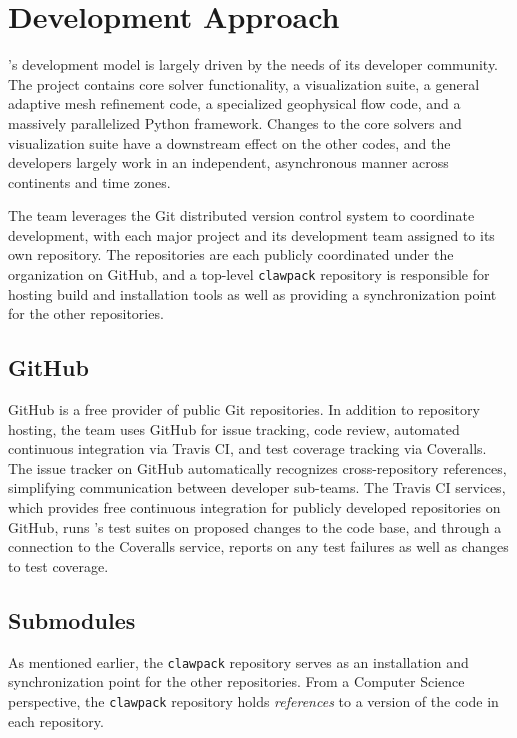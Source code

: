 %
%
%

\section{Development Approach}

\clawpack's development model is largely driven by the needs of its
developer community.  The \clawpack project contains core solver
functionality, a visualization suite, a general adaptive mesh
refinement code, a specialized geophysical flow code, and a
massively parallelized Python framework.  Changes to the core solvers
and visualization suite have a downstream effect on the other codes,
and the developers largely work in an independent, asynchronous manner
across continents and time zones. 

The \clawpack team leverages the Git distributed version control system
to coordinate development, with each major project and its development
team assigned to its own repository.  The repositories are each
publicly coordinated under the \clawpack organization on GitHub, and a
top-level \texttt{clawpack} repository is responsible for hosting
build and installation tools as well as providing a synchronization
point for the other repositories.

\subsection{GitHub}

GitHub is a free provider of public Git repositories.  In addition to
repository hosting, the \clawpack team uses GitHub for issue tracking,
code review, automated continuous integration via Travis CI, and test
coverage tracking via Coveralls.  The issue tracker on GitHub
automatically recognizes cross-repository references, simplifying
communication between \clawpack developer sub-teams.  The Travis CI
services, which provides free continuous integration for publicly
developed repositories on GitHub, runs \clawpack's test suites on
proposed changes to the code base, and through a connection to
the Coveralls service, reports on any test failures as well as changes
to test coverage.

\subsection{Submodules}

As mentioned earlier, the \texttt{clawpack} repository serves as an
installation and synchronization point for the other repositories.
From a Computer Science perspective, the \texttt{clawpack} repository
holds \textit{references} to a version of the code in each
repository.  

